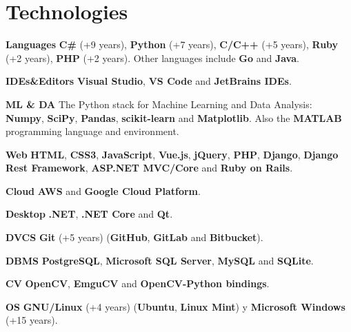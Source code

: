 \documentclass[]{friggeri-cv}
\begin{document}
\section{Technologies}
\begin{entrylist}
  \entry
    {\textbf{Languages}}
    {}
    {}
    {\textbf{C\#} (+9 years), \textbf{Python} (+7 years), \textbf{C/C++} (+5 years), \textbf{Ruby} (+2 years), \textbf{PHP} (+2 years). Other languages include \textbf{Go} and \textbf{Java}.}

  \entry
    {\textbf{IDEs\&Editors}}
    {}
    {}
    {\textbf{Visual Studio}, \textbf{VS Code} and \textbf{JetBrains IDEs}.}
\end{entrylist}

\begin{entrylist}
  \entry
    {\textbf{ML \& DA}}
    {}
    {}
    {The Python stack for Machine Learning and Data Analysis: \textbf{Numpy}, \textbf{SciPy}, \textbf{Pandas}, \textbf{scikit-learn} and \textbf{Matplotlib}. Also the \textbf{MATLAB} programming language and environment.}

  \entry
    {\textbf{Web}}
    {}
    {}
    {\textbf{HTML}, \textbf{CSS3}, \textbf{JavaScript}, \textbf{Vue.js}, \textbf{jQuery}, \textbf{PHP}, \textbf{Django}, \textbf{Django Rest Framework}, \textbf{ASP.NET MVC/Core} and \textbf{Ruby on Rails}.}

  \entry
    {\textbf{Cloud}}
    {}
    {}
    {\textbf{AWS} and \textbf{Google Cloud Platform}.}

  \entry
    {\textbf{Desktop}}
    {}
    {}
    {\textbf{.NET}, \textbf{.NET Core} and \textbf{Qt}.}

  \entry
    {\textbf{DVCS}}
    {}
    {}
    {\textbf{Git} (+5 years) (\textbf{GitHub}, \textbf{GitLab} and \textbf{Bitbucket}).}
    
  \entry
    {\textbf{DBMS}}
    {}
    {}
    {\textbf{PostgreSQL}, \textbf{Microsoft SQL Server}, \textbf{MySQL} and \textbf{SQLite}.}
    
  \entry
    {\textbf{CV}}
    {}
    {}
    {\textbf{OpenCV}, \textbf{EmguCV} and \textbf{OpenCV-Python bindings}.}      
    
  \entry
    {\textbf{OS}}
    {}
    {}
    {\textbf{GNU/Linux} (+4 years) (\textbf{Ubuntu}, \textbf{Linux Mint}) y \textbf{Microsoft Windows} (+15 years).}
\end{entrylist}
\\
\end{document}

